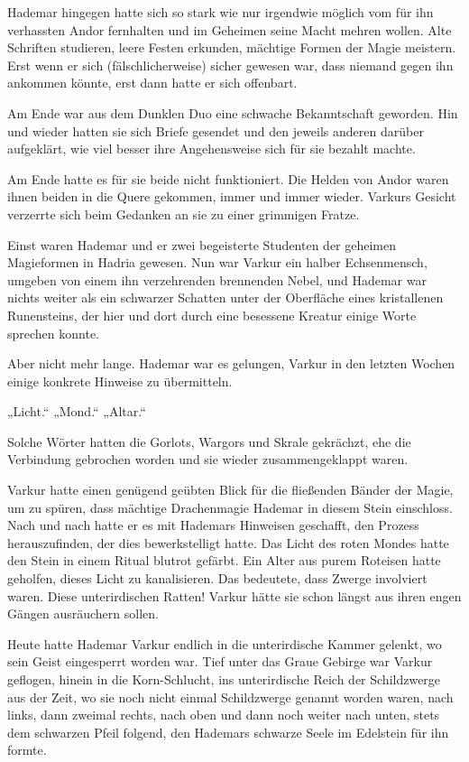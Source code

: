Hademar hingegen hatte sich so stark wie nur irgendwie möglich vom für ihn verhassten Andor fernhalten und im Geheimen seine Macht mehren wollen. Alte Schriften studieren, leere Festen erkunden, mächtige Formen der Magie meistern. Erst wenn er sich (fälschlicherweise) sicher gewesen war, dass niemand gegen ihn ankommen könnte, erst dann hatte er sich offenbart.

Am Ende war aus dem Dunklen Duo eine schwache Bekanntschaft geworden. Hin und wieder hatten sie sich Briefe gesendet und den jeweils anderen darüber aufgeklärt, wie viel besser ihre Angehensweise sich für sie bezahlt machte.

Am Ende hatte es für sie beide nicht funktioniert. Die Helden von Andor waren ihnen beiden in die Quere gekommen, immer und immer wieder. Varkurs Gesicht verzerrte sich beim Gedanken an sie zu einer grimmigen Fratze.

Einst waren Hademar und er zwei begeisterte Studenten der geheimen Magieformen in Hadria gewesen. Nun war Varkur ein halber Echsenmensch, umgeben von einem ihn verzehrenden brennenden Nebel, und Hademar war nichts weiter als ein schwarzer Schatten unter der Oberfläche eines kristallenen Runensteins, der hier und dort durch eine besessene Kreatur einige Worte sprechen konnte.

Aber nicht mehr lange. Hademar war es gelungen, Varkur in den letzten Wochen einige konkrete Hinweise zu übermitteln.

„Licht.“ „Mond.“ „Altar.“

Solche Wörter hatten die Gorlots, Wargors und Skrale gekrächzt, ehe die Verbindung gebrochen worden und sie wieder zusammengeklappt waren.

Varkur hatte einen genügend geübten Blick für die fließenden Bänder der Magie, um zu spüren, dass mächtige Drachenmagie Hademar in diesem Stein einschloss. Nach und nach hatte er es mit Hademars Hinweisen geschafft, den Prozess herauszufinden, der dies bewerkstelligt hatte. Das Licht des roten Mondes hatte den Stein in einem Ritual blutrot gefärbt. Ein Alter aus purem Roteisen hatte geholfen, dieses Licht zu kanalisieren. Das bedeutete, dass Zwerge involviert waren. Diese unterirdischen Ratten! Varkur hätte sie schon längst aus ihren engen Gängen ausräuchern sollen.

Heute hatte Hademar Varkur endlich in die unterirdische Kammer gelenkt, wo sein Geist eingesperrt worden war. Tief unter das Graue Gebirge war Varkur geflogen, hinein in die Korn-Schlucht, ins unterirdische Reich der Schildzwerge aus der Zeit, wo sie noch nicht einmal Schildzwerge genannt worden waren, nach links, dann zweimal rechts, nach oben und dann noch weiter nach unten, stets dem schwarzen Pfeil folgend, den Hademars schwarze Seele im Edelstein für ihn formte.

